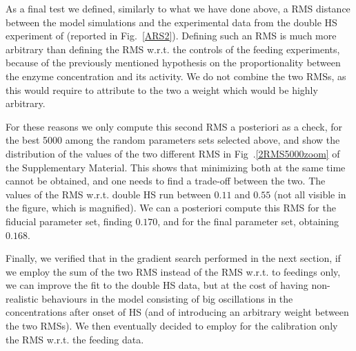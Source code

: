 \documentclass[oneside, 10pt, a4paper, twocolumn]{article}
\begin{document}
As a final test we defined, similarly to what we have done above, a RMS distance between the model simulations and the experimental data from the double HS experiment of \cite{Schroda2000} (reported in Fig.~\ref{ARS2}). 
Defining such an RMS is much more arbitrary than defining the RMS w.r.t. the controls of the feeding experiments, because of the previously mentioned hypothesis on the proportionality between the enzyme concentration and its activity. %
We do not combine the two RMSs, as this would require to attribute to the two a weight which would be highly arbitrary. 

For these reasons we only compute this second RMS a posteriori as a check, for the best 5000 among the random parameters sets selected above, and show the distribution of the values of the two different RMS in Fig~.\ref{2RMS5000zoom} of the Supplementary Material. This shows that minimizing both at the same time cannot be obtained, and one needs to find a trade-off between the two. The values of the RMS w.r.t. double HS run between $0.11$ and $0.55$ (not all visible in the figure, which is magnified). We can a posteriori compute this RMS for the fiducial parameter set, finding $0.170$, and for the final parameter set, obtaining $0.168$.

Finally, we verified that in the gradient search performed in the next section, if we employ the sum of the two RMS instead of the RMS w.r.t. to feedings only, we can improve the fit to the double HS data, but at the cost of having non-realistic behaviours in the model consisting of big oscillations in the concentrations after onset of HS (and of introducing an arbitrary weight between the two RMSs). We then eventually decided to employ for the calibration only the RMS w.r.t. the feeding data.
\end{document}
